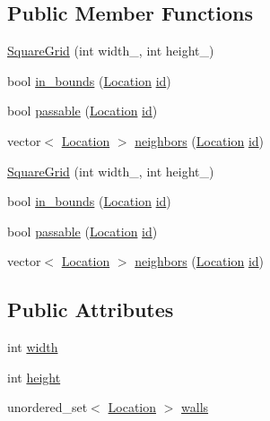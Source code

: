 \subsection*{Public Member Functions}
\begin{DoxyCompactItemize}
\item 
\mbox{\hyperlink{struct_square_grid_ae5debd1459b89aba9497f270f6d76d7b}{Square\+Grid}} (int width\+\_\+, int height\+\_\+)
\item 
bool \mbox{\hyperlink{struct_square_grid_a84bbaa9dad618228a2d6d3196254b86b}{in\+\_\+bounds}} (\mbox{\hyperlink{struct_square_grid_a2c9a2cbd3912aa48ac97289abc3f1c0f}{Location}} \mbox{\hyperlink{glad_8h_a58c2a664503e14ffb8f21012aabff3e9}{id}})
\item 
bool \mbox{\hyperlink{struct_square_grid_a3f638b46510dd880823b1acac75c7b96}{passable}} (\mbox{\hyperlink{struct_square_grid_a2c9a2cbd3912aa48ac97289abc3f1c0f}{Location}} \mbox{\hyperlink{glad_8h_a58c2a664503e14ffb8f21012aabff3e9}{id}})
\item 
vector$<$ \mbox{\hyperlink{struct_square_grid_a2c9a2cbd3912aa48ac97289abc3f1c0f}{Location}} $>$ \mbox{\hyperlink{struct_square_grid_a106d76702d8c4acb03883c477db28e3a}{neighbors}} (\mbox{\hyperlink{struct_square_grid_a2c9a2cbd3912aa48ac97289abc3f1c0f}{Location}} \mbox{\hyperlink{glad_8h_a58c2a664503e14ffb8f21012aabff3e9}{id}})
\item 
\mbox{\hyperlink{struct_square_grid_ae5debd1459b89aba9497f270f6d76d7b}{Square\+Grid}} (int width\+\_\+, int height\+\_\+)
\item 
bool \mbox{\hyperlink{struct_square_grid_a84bbaa9dad618228a2d6d3196254b86b}{in\+\_\+bounds}} (\mbox{\hyperlink{struct_square_grid_a2c9a2cbd3912aa48ac97289abc3f1c0f}{Location}} \mbox{\hyperlink{glad_8h_a58c2a664503e14ffb8f21012aabff3e9}{id}})
\item 
bool \mbox{\hyperlink{struct_square_grid_a3f638b46510dd880823b1acac75c7b96}{passable}} (\mbox{\hyperlink{struct_square_grid_a2c9a2cbd3912aa48ac97289abc3f1c0f}{Location}} \mbox{\hyperlink{glad_8h_a58c2a664503e14ffb8f21012aabff3e9}{id}})
\item 
vector$<$ \mbox{\hyperlink{struct_square_grid_a2c9a2cbd3912aa48ac97289abc3f1c0f}{Location}} $>$ \mbox{\hyperlink{struct_square_grid_a106d76702d8c4acb03883c477db28e3a}{neighbors}} (\mbox{\hyperlink{struct_square_grid_a2c9a2cbd3912aa48ac97289abc3f1c0f}{Location}} \mbox{\hyperlink{glad_8h_a58c2a664503e14ffb8f21012aabff3e9}{id}})
\end{DoxyCompactItemize}
\subsection*{Public Attributes}
\begin{DoxyCompactItemize}
\item 
int \mbox{\hyperlink{struct_square_grid_af5476cf49f0bb03d1e940adbc6e5febf}{width}}
\item 
int \mbox{\hyperlink{struct_square_grid_ad6b113fc3a49f5db5fbf9c8138e35634}{height}}
\item 
unordered\+\_\+set$<$ \mbox{\hyperlink{struct_square_grid_a2c9a2cbd3912aa48ac97289abc3f1c0f}{Location}} $>$ \mbox{\hyperlink{struct_square_grid_a1bc7e32bd195e42fd9685310d7ee65c5}{walls}}
\end{DoxyCompactItemize}
